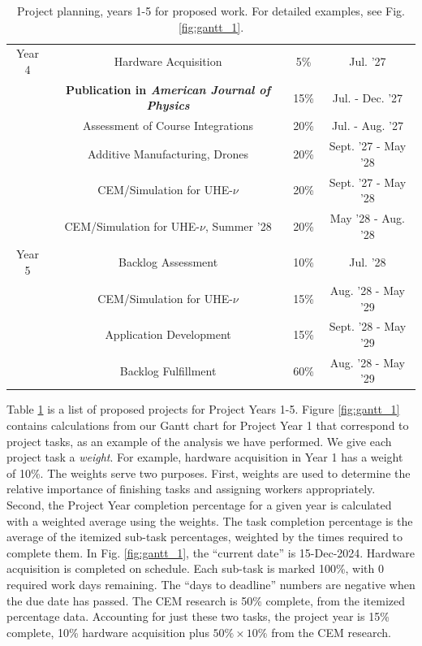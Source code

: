 \documentclass[../../main.tex]{subfiles}
\begin{document}
\begin{table}[ht]
\begin{tabular}{c | c | c | c}
\hline
Year 4 & Hardware Acquisition & 5\% & Jul. '27 \\
 & \textbf{Publication in \textit{American Journal of Physics}} & 15\% & Jul. - Dec. '27 \\
 & Assessment of Course Integrations & 20\% & Jul. - Aug. '27 \\
 & Additive Manufacturing, Drones & 20\% & Sept. '27 - May '28 \\
 & CEM/Simulation for UHE-$\nu$ & 20\% & Sept. '27 - May '28 \\
 & CEM/Simulation for UHE-$\nu$, Summer '28 & 20\% & May '28 - Aug. '28 \\
\hline
Year 5 & Backlog Assessment & 10\% & Jul. '28 \\
 & CEM/Simulation for UHE-$\nu$ & 15\% & Aug. '28 - May '29 \\
 & Application Development & 15\% & Sept. '28 - May '29 \\
 & Backlog Fulfillment & 60\% & Aug. '28 - May '29 \\ 
\hline
\end{tabular}
\caption{\label{tab:plan} Project planning, years 1-5 for proposed work.  For detailed examples, see Fig. \ref{fig:gantt_1}.}
\end{table}

Table \ref{tab:plan} is a list of proposed projects for Project Years 1-5.  Figure \ref{fig:gantt_1} contains calculations from our Gantt chart for Project Year 1 that correspond to project tasks, as an example of the analysis we have performed.  We give each project task a \textit{weight}.  For example, hardware acquisition in Year 1 has a weight of 10\%.  The weights serve two purposes.  First, weights are used to determine the relative importance of finishing tasks and assigning workers appropriately.  Second, the Project Year completion percentage for a given year is calculated with a weighted average using the weights.  The task completion percentage is the average of the itemized sub-task percentages, weighted by the times required to complete them.  In Fig. \ref{fig:gantt_1}, the ``current date'' is 15-Dec-2024.  Hardware acquisition is completed on schedule.  Each sub-task is marked 100\%, with 0 required work days remaining.  The ``days to deadline'' numbers are negative when the due date has passed.  The CEM research is 50\% complete, from the itemized percentage data.  Accounting for just these two tasks, the project year is 15\% complete, 10\% hardware acquisition plus $50\% \times 10\%$  from the CEM research. \\ \vspace{2.5mm}
\end{document}
